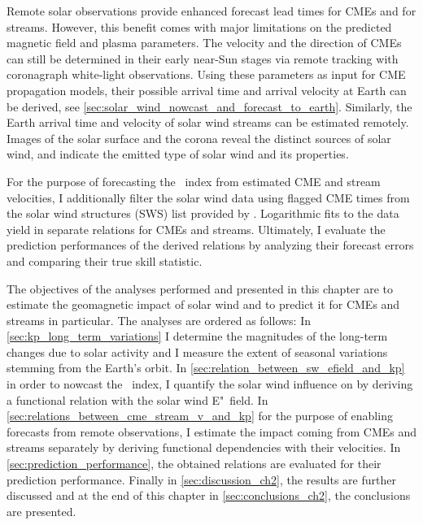Remote solar observations provide enhanced forecast lead times for CMEs and for streams. However, this benefit comes with major limitations on the predicted magnetic field and plasma parameters. The velocity and the direction of CMEs can still be determined in their early near-Sun stages via remote tracking with coronagraph white-light observations. Using these parameters as input for CME propagation models, their possible arrival time and arrival velocity at Earth can be derived, see \autoref{sec:solar_wind_nowcast_and_forecast_to_earth}. Similarly, the Earth arrival time and velocity of solar wind streams can be estimated remotely. Images of the solar surface and the corona reveal the distinct sources of solar wind, and indicate the emitted type of solar wind and its properties.

For the purpose of forecasting the \Kp~index from estimated CME and stream velocities, I additionally filter the solar wind data using flagged CME times from the solar wind structures (SWS) list provided by \citet{Richardson2012}. Logarithmic fits to the data yield in separate \Kp{} relations for CMEs and streams.
Ultimately, I evaluate the prediction performances of the derived relations by analyzing their forecast errors and comparing their true skill statistic.

The objectives of the analyses performed and presented in this chapter are to estimate the geomagnetic impact of solar wind and to predict it for CMEs and streams in particular. The analyses are ordered as follows: In \autoref{sec:kp_long_term_variations} I determine the magnitudes of the long-term \Kp{} changes due to solar activity and I measure the extent of seasonal variations stemming from the Earth's orbit. In \autoref{sec:relation_between_sw_efield_and_kp} in order to nowcast the \Kp~index, I quantify the solar wind influence on \Kp{} by deriving a functional relation with the solar wind E"~field. In \autoref{sec:relations_between_cme_stream_v_and_kp} for the purpose of enabling \Kp{} forecasts from remote observations, I estimate the \Kp{} impact coming from CMEs and streams separately by deriving functional dependencies with their velocities. In \autoref{sec:prediction_performance}, the obtained \Kp{} relations are evaluated for their prediction performance. Finally in \autoref{sec:discussion_ch2}, the results are further discussed and at the end of this chapter in \autoref{sec:conclusions_ch2}, the conclusions are presented.


